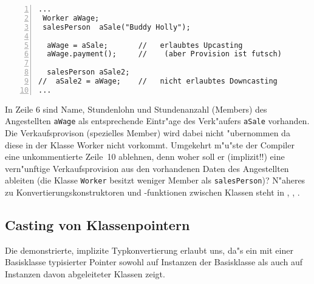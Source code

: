 \begin{lstlisting}[caption={Casting bei Klassen.},label=lst:casting_klassen_1,
basicstyle=\scriptsize,numbers=left, numberstyle=\tiny, stepnumber=2, numbersep=5pt]
...
 Worker aWage;
 salesPerson  aSale("Buddy Holly");

  aWage = aSale;       //   erlaubtes Upcasting
  aWage.payment();     //    (aber Provision ist futsch)

  salesPerson aSale2;
//  aSale2 = aWage;    //   nicht erlaubtes Downcasting
...
\end{lstlisting}

%
In Zeile 6 sind Name, Stundenlohn und Stundenanzahl (Members) des Angestellten \texttt{aWage}
als entsprechende Eintr"age des Verk"aufers \texttt{aSale} vorhanden.
Die Verkaufsprovison (spezielles Member) wird dabei nicht "ubernommen da diese in der Klasse Worker nicht vorkommt.
Umgekehrt m"u"ste der Compiler eine unkommentierte Zeile~10 ablehnen, denn
woher soll er (implizit!!) eine vern"unftige Verkaufsprovision aus den
vorhandenen Daten des Angestellten ableiten
(die Klasse \texttt{Worker} besitzt weniger Member  als \texttt{salesPerson})?
N"aheres zu Konvertierungskonstruktoren und -funktionen zwischen Klassen steht in
\cite[\S9 und \S19]{KirchPrinz:2002:OOP},
\cite[\S9.4.4]{Schmaranz:2002:SCP},
\cite[\S16.5]{SchaderKuhlins:1998:PCP}.
%
%
\subsection{Casting von Klassenpointern}
\label{sec:A4.2}
%
Die demonstrierte, implizite Typkonvertierung erlaubt uns, da"s ein mit einer
Basisklasse typisierter Pointer sowohl auf Instanzen der Basisklasse als auch auf
Instanzen davon abgeleiteter Klassen zeigt.

